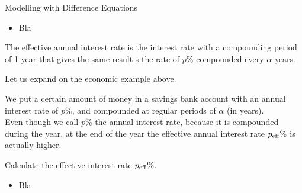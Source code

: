 \standardonlynewpage

%
%



\begin{module}{Modelling with Difference Equations}
	\label{diff:model}

	
	
\end{module}



\begin{lesson}

	\begin{itemize}
		\item Bla
	\end{itemize}
	

\end{lesson}



\begin{annotation}
\begin{goals}
	The effective annual interest rate is the interest rate with a compounding period of 1 year that gives the same result s the rate of $p\%$ compounded every $\alpha$ years.
\end{goals}
\end{annotation}
\question
	Let us expand on the economic example above.
	
	We put a certain amount of money in a savings bank account with an annual interest rate of $p\%$, and compounded at regular periods of $\alpha$ (in years). \\
	
	Even though we call $p\%$ the annual interest rate, because it is compounded during the year, at the end of the year the effective annual interest rate $p_{\rm eff}\%$ is actually higher.
	
	Calculate the effective interest rate $p_{\rm eff}\%$.


	

\bookonlynewpage



\begin{lesson}

	\begin{itemize}
		\item Bla
	\end{itemize}
	

\end{lesson}




